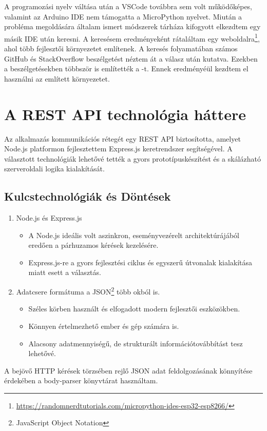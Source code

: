 \documentclass{thesis-ekf}
\theoremstyle{definition}
\theoremstyle{remark}
\begin{document}
	A programozási nyelv váltása után a VSCode továbbra sem volt működőképes, valamint az Arduino IDE nem támogatta a MicroPython nyelvet. Miután a probléma megoldására általam ismert módszerek tárháza kifogyott elkezdtem egy másik IDE után keresni. A keresésem eredményeként rátaláltam egy weboldalra\footnote{\url{https://randomnerdtutorials.com/micropython-ides-esp32-esp8266/}}, ahol több fejlesztői környezetet említenek. A keresés folyamatában számos GitHub és StackOverflow beszélgetést néztem át a válasz után kutatva. Ezekben a beszélgetésekben többször is említették a \href{https://thonny.org/}{\color{blue}{ThonyIDE}}-t. Ennek eredményéül kezdtem el használni az említett környezetet.
	\section{A REST API technológia háttere}
	Az alkalmazás kommunikációs rétegét egy REST API biztosította, amelyet Node.js platformon fejlesztettem Express.js keretrendszer segítségével. A választott technológiák lehetővé tették a gyors prototípuskészítést és a skálázható szerveroldali logika kialakítását.
	\subsection{Kulcstechnológiák és Döntések}
	\begin{enumerate}
		\item Node.js és Express.js
		\begin{itemize}
			\item A Node.js ideális volt aszinkron, eseményvezérelt architektúrájából eredően a párhuzamos kérések kezelésére.
			\item Express.js-re a gyors fejlesztési ciklus és egyszerű útvonalak kialakítása miatt esett a választás.
		\end{itemize}
		\item Adatcsere formátuma a JSON\footnote{JavaScript Object Notation} több okból is.
		\begin{itemize}
			\item Széles körben használt és elfogadott modern fejlesztői eszközökben.
			\item Könnyen értelmezhető ember és gép számára is.
			\item Alacsony adatmennyiségű, de strukturált információtovábbítást tesz lehetővé.
		\end{itemize}
	\end{enumerate}
	A bejövő HTTP kérések törzsében rejlő JSON adat feldolgozásának könnyítése érdekében a body-parser könyvtárat használtam.
\end{document}
